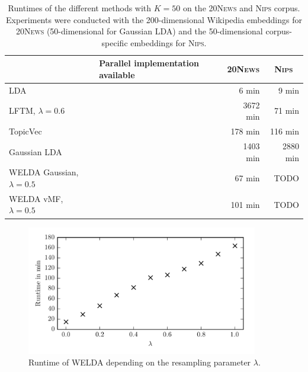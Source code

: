 \documentclass[
        a4paper,
        titlepage,
        twoside,
        parskip,
        numbers=noenddot
        ]{scrbook}
\newcommand{\ra}[1]{\renewcommand{\arraystretch}{#1}}
\newcommand{\cmark}{\ding{51}}
\newcommand{\xmark}{\ding{55}}
\theoremstyle{break}
\begin{document}
\begin{table}[]
  \ra{1.2}
  \centering
  \caption{Runtimes of the different methods with $K = 50$ on the \textsc{20News} and \textsc{Nips} corpus.
  Experiments were conducted with the 200-dimensional Wikipedia embeddings for \textsc{20News} (50-dimensional for Gaussian LDA) and the 50-dimensional corpus-specific embeddings for \textsc{Nips}.
  }
  \label{table:runtime}
  \begin{tabular}{@{}lp{4cm}rr@{}}
    \toprule
                                    & Parallel implementation \newline available & \multicolumn{1}{c}{\textsc{20News}} & \multicolumn{1}{c}{\textsc{Nips}} \\
    \midrule
    LDA                             & ~~~~~~~~~~~~~~~~\cmark                     &    6 min                            &    9 min \\ %
    LFTM, $\lambda = 0.6$           & ~~~~~~~~~~~~~~~~\xmark                     & 3672 min                            &   71 min \\
    TopicVec                        & ~~~~~~~~~~~~~~~~\cmark                     &  178 min                            &  116 min \\
    Gaussian LDA                    & ~~~~~~~~~~~~~~~~\xmark                     & 1403 min                            & 2880 min \\
    WELDA Gaussian, $\lambda = 0.5$ & ~~~~~~~~~~~~~~~~\xmark                     &   67 min                            & TODO \\  %
    WELDA vMF, $\lambda = 0.5$      & ~~~~~~~~~~~~~~~~\xmark                     &  101 min                            & TODO \\ \bottomrule
  \end{tabular}
\end{table}

\begin{figure}
       \centering
       \includegraphics[width=0.9\textwidth]{figures/welda_lambda_runtime.png}
       \caption{Runtime of WELDA depending on the resampling parameter $\lambda$.}
       \label{fig:welda_lambda_runtime}
\end{figure}
\end{document}
